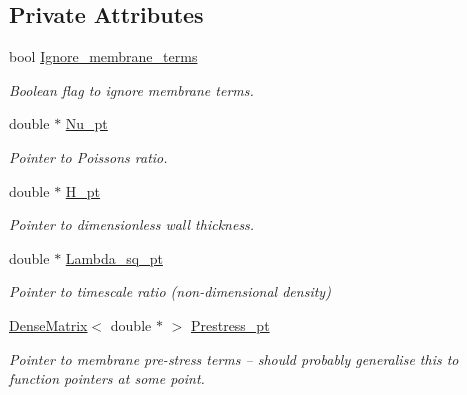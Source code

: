 \subsection*{Private Attributes}
\begin{DoxyCompactItemize}
\item 
bool \hyperlink{classoomph_1_1KirchhoffLoveShellEquations_a2799b63fc1219f6aab912a8e3e9824eb}{Ignore\+\_\+membrane\+\_\+terms}
\begin{DoxyCompactList}\small\item\em Boolean flag to ignore membrane terms. \end{DoxyCompactList}\item 
double $\ast$ \hyperlink{classoomph_1_1KirchhoffLoveShellEquations_a8e22a8093db86c446cca68b3db60d6a4}{Nu\+\_\+pt}
\begin{DoxyCompactList}\small\item\em Pointer to Poisson\textquotesingle{}s ratio. \end{DoxyCompactList}\item 
double $\ast$ \hyperlink{classoomph_1_1KirchhoffLoveShellEquations_a2fbe4ac69bae147cdcb2ab43d0284d40}{H\+\_\+pt}
\begin{DoxyCompactList}\small\item\em Pointer to dimensionless wall thickness. \end{DoxyCompactList}\item 
double $\ast$ \hyperlink{classoomph_1_1KirchhoffLoveShellEquations_a6e376a6118f141add6c76cba6551b464}{Lambda\+\_\+sq\+\_\+pt}
\begin{DoxyCompactList}\small\item\em Pointer to timescale ratio (non-\/dimensional density) \end{DoxyCompactList}\item 
\hyperlink{classoomph_1_1DenseMatrix}{Dense\+Matrix}$<$ double $\ast$ $>$ \hyperlink{classoomph_1_1KirchhoffLoveShellEquations_a6e2455e49a707f5ffdf8439a6dffcea9}{Prestress\+\_\+pt}
\begin{DoxyCompactList}\small\item\em Pointer to membrane pre-\/stress terms -- should probably generalise this to function pointers at some point. \end{DoxyCompactList}\end{DoxyCompactItemize}
